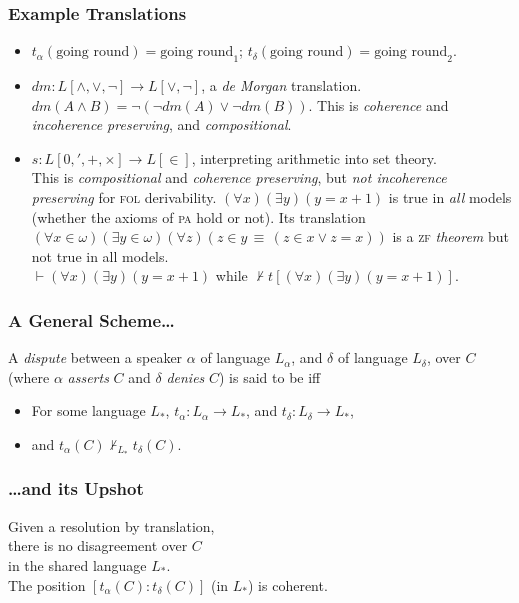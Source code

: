 \documentclass{beamer} %
\begin{document}
\begin{frame}\frametitle{Example Translations}
\begin{itemize}
\item $t_\alpha(\textrm{going round})=\textrm{going round}_1$; $t_\delta(\textrm{going round})=\textrm{going round}_2$.\\[3mm]\pause
\item $dm:L[\land,\lor,\neg]\to L[\lor,\neg]$, a \emph{de Morgan} translation. $dm(A\land B)=\neg(\neg dm(A)\lor\neg dm(B))$. This is \emph{coherence} and \emph{incoherence preserving}, and \emph{compositional}.\\[3mm]\pause
\item $s:L[0,',+,\times]\to L[\in]$, interpreting arithmetic into set theory. \\[2mm] \pause\small
This is \emph{compositional} and \emph{coherence preserving}, but \emph{not incoherence preserving} for \textsc{fol} derivability.  $(\forall x)(\exists y)(y=x+1)$ is true in \emph{all} models (whether the axioms of \textsc{pa} hold or not). Its translation $(\forall x\in\omega)(\exists y\in \omega)(\forall z)({z\in y}\,\equiv\,({z\in x}\lor{z=x}))$ is a \textsc{zf} \emph{theorem} but not true in all models.\\[2mm]\pause
$\vdash(\forall x)(\exists y)(y=x+1)$ while $\not\vdash t[(\forall x)(\exists y)(y=x+1)]$.
\end{itemize}
\end{frame}

\begin{frame}\frametitle{A General Scheme\ldots}\Large
	
A \emph{dispute} \pause
between a speaker $\alpha$ of language $L_\alpha$, \pause
and $\delta$ of language $L_\delta$, \pause
over $C$ \pause
(where $\alpha$ \emph{asserts} $C$ and $\delta$ \emph{denies} $C$) \pause
is said to be \textsc{}
iff 

\pause\medskip

\begin{itemize}
\item For some language $L_*$, $t_\alpha:L_\alpha \to L_*$, and $t_\delta: L_\delta\to L_*$,\\[2mm]\pause
\item and $t_\alpha(C)\not\vdash_{L_*}t_\delta(C)$.
\end{itemize}
\end{frame}

\begin{frame}\frametitle{\ldots and its Upshot}
\begin{center}\Large
Given a resolution by translation,\\ 
there is no disagreement over $C$ \\
in the shared language $L_*$.\\[7.5mm]\pause
The position $[t_\alpha(C):t_\delta(C)]$ (in $L_*$) is coherent.
\end{center}
\end{frame}
\end{document}
